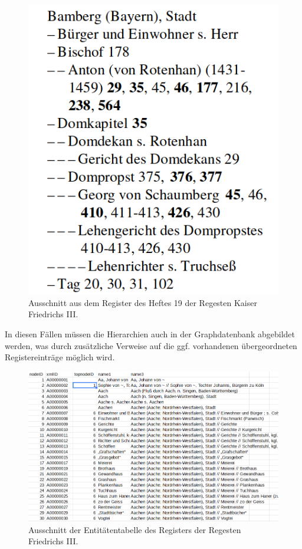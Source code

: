 \documentclass[ngerman,]{scrreprt}
\begin{document}
\begin{figure}
\centering
\includegraphics{Bilder/RI2Graph/ReggF3-Registerhierarchie.png}
\caption{Ausschnitt aus dem Register des Heftes 19 der Regesten Kaiser Friedrichs III.}
\end{figure}

In diesen Fällen müssen die Hierarchien auch in der Graphdatenbank abgebildet werden, was durch zusätzliche Verweise auf die ggf. vorhandenen übergeordneten Registereinträge möglich wird.

\begin{figure}
\centering
\includegraphics{Bilder/RI2Graph/RegisterF3-Hierarchie.png}
\caption{Ausschnitt der Entitätentabelle des Registers der Regesten Friedrichs III.}
\end{figure}
\end{document}
